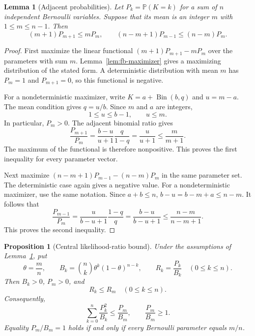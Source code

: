 \documentclass[11pt,a4paper]{article}
\newtheorem{lemma}[theorem]{Lemma}
\newtheorem{proposition}[theorem]{Proposition}
\theoremstyle{definition}
\theoremstyle{remark}
\begin{document}
\begin{lemma}[Adjacent probabilities]\label{lem:fb-adjacent}
Let $P_k=\mathbb{P}(K=k)$ for a sum of $n$ independent Bernoulli
variables. Suppose that its mean is an integer $m$ with
$1\leq m\leq n-1$. Then
\begin{equation}\label{eq:fb-adjacent}
 (m+1)P_{m+1}\leq mP_m,
 \qquad
 (n-m+1)P_{m-1}\leq(n-m)P_m.
\end{equation}
\end{lemma}

\begin{proof}
First maximize the linear functional
$(m+1)P_{m+1}-mP_m$ over the parameters with sum $m$.
Lemma~\ref{lem:fb-maximizer} gives a maximizing distribution of the
stated form. A deterministic distribution with mean $m$ has
$P_m=1$ and $P_{m+1}=0$, so this functional is negative.

For a nondeterministic maximizer, write
$K=a+\operatorname{Bin}(b,q)$ and $u=m-a$.
The mean condition gives $q=u/b$. Since $m$ and $a$ are integers,
\[
 1\leq u\leq b-1,\qquad u\leq m.
\]
In particular, $P_m>0$. The adjacent binomial ratio gives
\[
 \frac{P_{m+1}}{P_m}
 =\frac{b-u}{u+1}\frac{q}{1-q}
 =\frac{u}{u+1}
 \leq\frac{m}{m+1}.
\]
The maximum of the functional is therefore nonpositive. This proves
the first inequality for every parameter vector.

Next maximize
$(n-m+1)P_{m-1}-(n-m)P_m$ in the same parameter set.
The deterministic case again gives a negative value.
For a nondeterministic maximizer, use the same notation.
Since $a+b\leq n$, $b-u=b-m+a\leq n-m$.
It follows that
\[
 \frac{P_{m-1}}{P_m}
 =\frac{u}{b-u+1}\frac{1-q}{q}
 =\frac{b-u}{b-u+1}
 \leq\frac{n-m}{n-m+1}.
\]
This proves the second inequality.
\end{proof}

\begin{proposition}[Central likelihood-ratio bound]\label{prop:fb-central}
Under the assumptions of Lemma~\ref{lem:fb-adjacent}, put
\[
 \theta=\frac mn,\qquad
 B_k=\binom nk\theta^k(1-\theta)^{n-k},\qquad
 R_k=\frac{P_k}{B_k}\quad(0\leq k\leq n).
\]
Then $B_k>0$, $P_m>0$, and
\begin{equation}\label{eq:fb-central}
 R_k\leq R_m\quad(0\leq k\leq n).
\end{equation}
Consequently,
\begin{equation}\label{eq:fb-quadratic}
 \sum_{k=0}^n\frac{P_k^2}{B_k}\leq\frac{P_m}{B_m},
 \qquad
 \frac{P_m}{B_m}\geq1.
\end{equation}
Equality $P_m/B_m=1$ holds if and only if every Bernoulli parameter
equals $m/n$.
\end{proposition}
\end{document}
